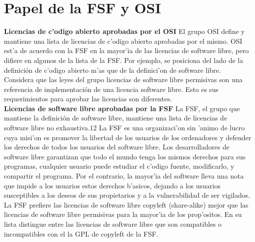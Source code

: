 \documentclass{book}
\begin{document}
\section{Papel de la FSF y OSI}

{\bf Licencias de c'odigo abierto aprobadas por el OSI}
El grupo OSI define y mantiene una lista de licencias de c'odigo abierto aprobadas por el mismo. OSI est'a de acuerdo con la FSF en la mayor'ia de las licencias de software libre, pero difiere en algunos de la lista de la FSF. Por ejemplo, se posiciona del lado de la definición de c'odigo abierto m'as que de la definici'on de software libre. Considera que las leyes del grupo licencias de software libre permisivas son una referencia de implementación de una licencia software libre. Esto es sus requerimientos para aprobar las licencias son diferentes.
\\
{\bf Licencias de software libre aprobadas por la FSF}
La FSF, el grupo que mantiene la definición de software libre, mantiene una lista de licencias de software libre no exhaustiva.12 La FSF es una organizaci'on sin 'animo de lucro cuya misi'on es promover la libertad de los usuarios de los ordenadores y defender los derechos de todos los usuarios del software libre. Los desarrolladores de software libre garantizan que todo el mundo tenga los mismos derechos para sus programas, cualquier usuario puede estudiar el c'odigo fuente, modificarlo, y compartir el programa. Por el contrario, la mayor'ia del software lleva una nota que impide a los usuarios estos derechos b'asicos, dejando a los usuarios susceptibles a los deseos de sus propietarios y a la vulnerabilidad de ser vigilados. La FSF prefiere las licencias de software libre copyleft (share-alike) mejor que las licencias de software libre permisivas para la mayor'ia de los prop'ositos. En su lista distingue entre las licencias de software libre que son compatibles o incompatibles con el la GPL de copyleft de la FSF.
\\
\end{document}
